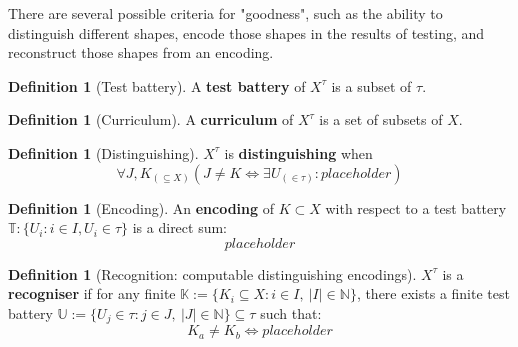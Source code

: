 \documentclass{tufte-handout}
\theoremstyle{definition}
\newtheorem{defn}[theorem]{Definition}
\newtheorem{remark}[theorem]{Remark}
\begin{document}
 There are several possible criteria for "goodness", such as the ability to distinguish different shapes, encode those shapes in the results of testing, and reconstruct those shapes from an encoding.

\begin{defn}[Test battery]
A \textbf{test battery} of $X^\tau$ is a subset of $\tau$.
\end{defn}
\begin{defn}[Curriculum]
A \textbf{curriculum} of $X^\tau$ is a set of subsets of $X$.
\end{defn}

\begin{defn}[Distinguishing]\label{def:distinguish}
$X^\tau$ is \textbf{distinguishing} when
\[\forall J,K_{(\subseteq X)} (J \neq K \iff \exists U_{(\in \tau)}: placeholder)\]
\end{defn}

\begin{defn}[Encoding]
An \textbf{encoding} of $K \subset X$ with respect to a test battery $\mathbb{T}: \{U_i : i \in I, U_i \in \tau\}$ is a direct sum:
\[placeholder\]
\end{defn}

\begin{defn}[Recognition: computable distinguishing encodings]
$X^\tau$ is a \textbf{recogniser} if for any finite $\mathbb{K} := \{ K_i \subseteq X : i \in I, \ |I|\in \mathbb{N} \}$, there exists a finite test battery $\mathbb{U} := \{ U_j \in \tau: j \in J, \ |J|\in \mathbb{N} \} \subseteq \tau$ such that:
\[K_a \neq K_b \iff placeholder\]
\end{defn}
\end{document}
